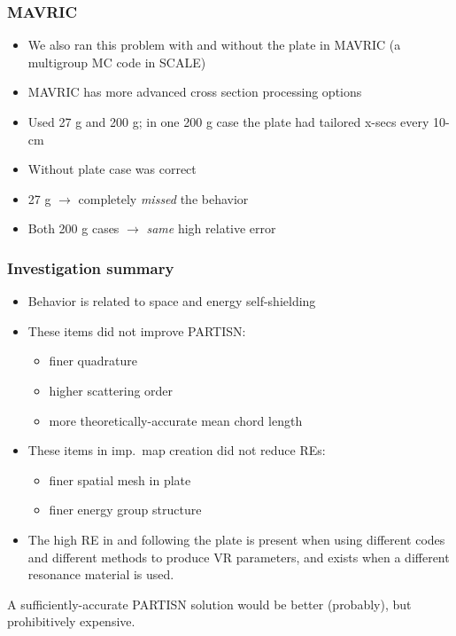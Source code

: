 \documentclass[xcolor=x11names,compress, handout]{beamer}
\renewcommand{\(}{\begin{columns}}
\renewcommand{\)}{\end{columns}}
\newcommand{\<}[1]{\begin{column}{#1}}
\renewcommand{\>}{\end{column}}
\begin{document}
\begin{frame}[fragile]
  \frametitle{MAVRIC}
  
  \begin{itemize}
  \item We also ran this problem with and without the plate in MAVRIC (a multigroup MC code in SCALE)
  \item MAVRIC has more advanced cross section processing options
  \item Used 27 g and 200 g; in one 200 g case the plate had tailored x-secs every 10-cm \vspace*{0.5em}
  \pause
  \item Without plate case was correct
  \item 27 g $\rightarrow$ completely \textit{missed} the behavior
  \item Both 200 g cases $\rightarrow$ \textit{same} high relative error
  \end{itemize}
  
\end{frame}


\begin{frame}[fragile]
  \frametitle{Investigation summary}
  
	\begin{itemize}
	\item Behavior is related to space and energy self-shielding
	\pause
	\item These items did not improve PARTISN:
	 \begin{itemize}
	 \item finer quadrature
	 \item higher scattering order
	 \item more theoretically-accurate mean chord length
	 \end{itemize}
	\pause 
	\item These items in imp.\ map creation did not reduce REs:
	 \begin{itemize}
	 \item finer spatial mesh in plate
	 \item finer energy group structure
	 \end{itemize}
	\pause 
	\item The high RE in and following the plate is present when using different codes and different methods to produce VR parameters, and exists when a different resonance material is used.
	\end{itemize}


A sufficiently-accurate PARTISN solution would be better (probably), but prohibitively expensive.
  
\end{frame}
\end{document}
